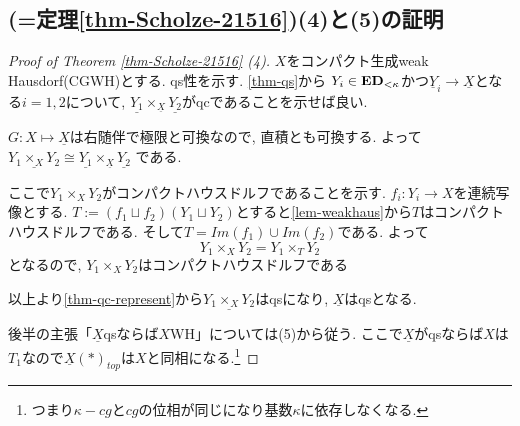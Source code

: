 \documentclass[dvipdfmx,a4paper,11pt]{article}
\theoremstyle{definition}
\begin{document}
\subsection{\cite[Proposition 2.15, Theorem 2.16]{Sch19}(=定理\ref{thm-Scholze-21516})(4)と(5)の証明}

\begin{proof}[Proof of Theorem \ref{thm-Scholze-21516} (4)]

$X$をコンパクト生成weak Hausdorf(CGWH)とする.
qs性を示す. \ref{thm-qs}から
$Y_i \in {\bf ED}_{< \kappa}$かつ$\underline{Y}_{i} \to \underline{X}$となる$i=1,2$について, 
$\underline{Y_1} \times_{\underline{X}} \underline{Y_2}$がqcであることを示せば良い. 

$G : X \mapsto \underline{X} $は右随伴で極限と可換なので, 直積とも可換する.
よって
$\underline{Y_1 \times_{X} Y_2} \cong \underline{Y_1} \times_{\underline{X}} \underline{Y_2}$
である.

ここで$Y_1 \times_{X} Y_2$がコンパクトハウスドルフであることを示す. 
$f_i : Y_i \to X$を連続写像とする. 
$T := (f_1 \sqcup f_2)(Y_1 \sqcup Y_2)$とすると\ref{lem-weakhaus}から$T$はコンパクトハウスドルフである.
そして$T = Im(f_1) \cup Im(f_2)$である. 
よって
$$
Y_1 \times_{X} Y_2 = Y_1 \times_{T} Y_2
$$
となるので, $Y_1 \times_{X} Y_2$はコンパクトハウスドルフである

以上より\ref{thm-qc-represent}から$\underline{Y_1 \times_{X} Y_2}$はqsになり, $\underline{X}$はqsとなる. 

後半の主張「$\underline{X}$qsならば$X$WH」については(5)から従う. 
ここで$\underline{X}$がqsならば$X$は$T_1$なので$\underline{X}(\ast)_{top} $は$X$と同相になる.\footnote{つまり$\kappa-cg$と$cg$の位相が同じになり基数$\kappa$に依存しなくなる. } 

\end{proof}
\end{document}
